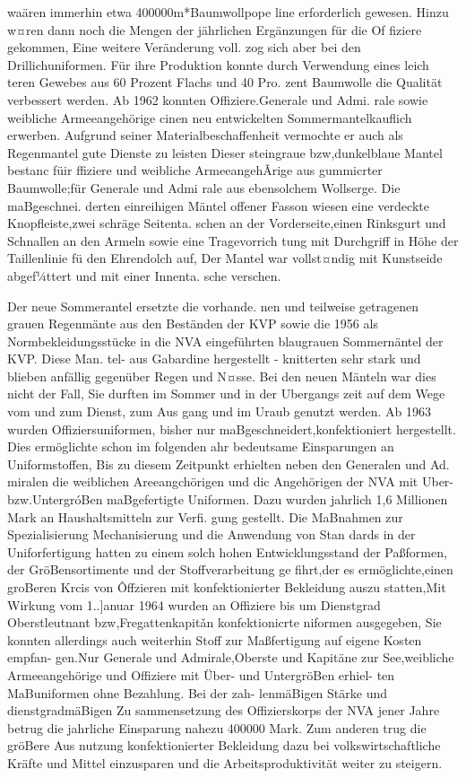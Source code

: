 waären immerhin etwa 400000m*Baumwollpope
line erforderlich gewesen. Hinzu w¤ren dann noch
die Mengen der jährlichen Ergänzungen für die Of
fiziere gekommen, Eine weitere Veränderung voll.
zog sich aber bei den Drillichuniformen. Für ihre
Produktion konnte durch Verwendung eines leich
teren Gewebes aus 60 Prozent Flachs und 40 Pro.
zent Baumwolle die Qualität verbessert werden.
Ab 1962 konnten Offiziere.Generale und Admi.
rale sowie weibliche Armeeangehörige cinen neu
entwickelten Sommermantelkauflich
erwerben.
Aufgrund seiner Materialbeschaffenheit vermochte
er auch als Regenmantel gute Dienste zu leisten
Dieser steingraue bzw,dunkelblaue Mantel bestanc
füir ffiziere und weibliche ArmeeangehÃrige aus
gummicrter Baumwolle;für Generale und Admi
rale aus ebensolchem Wollserge. Die maBgeschnei.
derten einreihigen Mäntel offener Fasson wiesen
eine verdeckte Knopfleiste,zwei schräge Seitenta.
schen an der Vorderseite,einen Rinksgurt und
Schnallen an den Armeln sowie eine Tragevorrich
tung mit Durchgriff in Höhe der Taillenlinie fü
den Ehrendolch auf, Der Mantel war vollst¤ndig
mit Kunstseide abgef¼ttert und mit einer Innenta.
sche verschen.

Der neue Sommerantel ersetzte die vorhande.
nen und teilweise getragenen grauen Regenmänte
aus den Beständen der KVP sowie die 1956 als
Normbekleidungsstücke in die NVA eingeführten
blaugrauen Sommernäntel der KVP. Diese Man.
tel- aus Gabardine hergestellt - knitterten sehr
stark und blieben anfällig gegenüber Regen und
N¤sse. Bei den neuen Mänteln war dies nicht der
Fall, Sie durften im Sommer und in der Ubergangs
zeit auf dem Wege vom und zum Dienst, zum Aus
gang und im Uraub genutzt werden.
Ab 1963 wurden Offiziersuniformen, bisher nur
maBgeschneidert,konfektioniert hergestellt. Dies
ermöglichte schon im folgenden ahr bedeutsame
Einsparungen an Uniformstoffen, Bis zu diesem
Zeitpunkt erhielten neben den Generalen und Ad.
miralen die weiblichen Areeangchörigen und dic
Angehörigen der NVA mit Uber- bzw.UntergróBen
maBgefertigte Uniformen. Dazu wurden jahrlich
1,6 Millionen Mark an Haushaltsmitteln zur Verfi.
gung gestellt. Die MaBnahmen zur Spezialisierung
Mechanisierung und die Anwendung von Stan
dards in der Uniforfertigung hatten zu einem
solch hohen Entwicklungsstand der Paßformen, der
GröBensortimente und der Stoffverarbeitung ge
fihrt,der es ermöglichte,einen groBeren Krcis von
Ôffzieren mit konfektionierter Bekleidung auszu
statten,Mit Wirkung vom 1..]anuar 1964 wurden
an Offiziere bis um Dienstgrad Oberstleutnant
bzw,Fregattenkapitǎn konfektionicrte niformen
ausgegeben, Sie konnten allerdings auch weiterhin
Stoff zur Maßfertigung auf eigene Kosten empfan-
gen.Nur Generale und Admirale,Oberste und
Kapitäne zur See,weibliche Armeeangehörige und
Offiziere mit Über- und UntergröBen erhiel-
ten MaBuniformen ohne Bezahlung. Bei der zah-
lenmäBigen Stärke und dienstgradmäBigen Zu
sammensetzung des Offizierskorps der NVA jener
Jahre betrug die jahrliche Einsparung nahezu
400000 Mark. Zum anderen trug die gröBere Aus
nutzung konfektionierter Bekleidung dazu bei
volkswirtschaftliche Kräfte und Mittel einzusparen
und die Arbeitsproduktivität weiter zu steigern.

